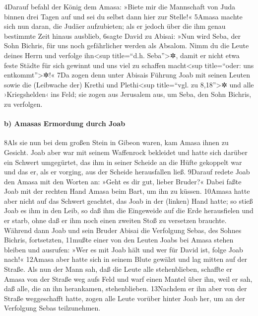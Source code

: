 4Darauf befahl der König dem Amasa: »Biete mir die Mannschaft von Juda
binnen drei Tagen auf und sei du selbst dann hier zur Stelle!« 5Amasa
machte sich nun daran, die Judäer aufzubieten; als er jedoch über die
ihm genau bestimmte Zeit hinaus ausblieb, 6sagte David zu Abisai: »Nun
wird Seba, der Sohn Bichris, für uns noch gefährlicher werden als
Absalom. Nimm du die Leute deines Herrn und verfolge ihn\textless sup
title=``d.h. Seba''\textgreater✲, damit er nicht etwa feste Städte für
sich gewinnt und uns viel zu schaffen macht\textless sup title=``oder:
uns entkommt''\textgreater✲!« 7Da zogen denn unter Abisais Führung Joab
mit seinen Leuten sowie die (Leibwache der) Krethi und
Plethi\textless sup title=``vgl. zu 8,18''\textgreater✲ und alle
›Kriegshelden‹ ins Feld; sie zogen aus Jerusalem aus, um Seba, den Sohn
Bichris, zu verfolgen.

\hypertarget{b-amasas-ermordung-durch-joab}{%
\paragraph{b) Amasas Ermordung durch
Joab}\label{b-amasas-ermordung-durch-joab}}

8Als sie nun bei dem großen Stein in Gibeon waren, kam Amasa ihnen zu
Gesicht. Joab aber war mit seinem Waffenrock bekleidet und hatte sich
darüber ein Schwert umgegürtet, das ihm in seiner Scheide an die Hüfte
gekoppelt war und das er, als er vorging, aus der Scheide herausfallen
ließ. 9Darauf redete Joab den Amasa mit den Worten an: »Geht es dir gut,
lieber Bruder?« Dabei faßte Joab mit der rechten Hand Amasa beim Bart,
um ihn zu küssen. 10Amasa hatte aber nicht auf das Schwert geachtet, das
Joab in der (linken) Hand hatte; so stieß Joab es ihm in den Leib, so
daß ihm die Eingeweide auf die Erde herausfielen und er starb, ohne daß
er ihm noch einen zweiten Stoß zu versetzen brauchte. Während dann Joab
und sein Bruder Abisai die Verfolgung Sebas, des Sohnes Bichris,
fortsetzten, 11mußte einer von den Leuten Joabs bei Amasa stehen bleiben
und ausrufen: »Wer es mit Joab hält und wer für David ist, folge Joab
nach!« 12Amasa aber hatte sich in seinem Blute gewälzt und lag mitten
auf der Straße. Als nun der Mann sah, daß die Leute alle stehenblieben,
schaffte er Amasa von der Straße weg aufs Feld und warf einen Mantel
über ihn, weil er sah, daß alle, die an ihn herankamen, stehenblieben.
13Nachdem er ihn aber von der Straße weggeschafft hatte, zogen alle
Leute vorüber hinter Joab her, um an der Verfolgung Sebas teilzunehmen.

